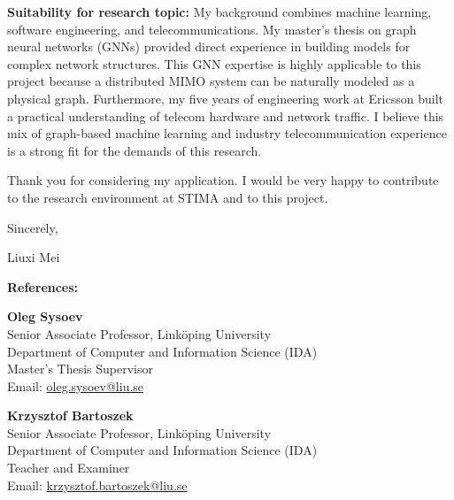 \documentclass[11pt,a4paper]{article}
\begin{document}
\textbf{Suitability for research topic:} My background combines machine learning, software engineering, and telecommunications. My master's thesis on graph neural networks (GNNs) provided direct experience in building models for complex network structures. This GNN expertise is highly applicable to this project because a distributed MIMO system can be naturally modeled as a physical graph. Furthermore, my five years of engineering work at Ericsson built a practical understanding of telecom hardware and network traffic. I believe this mix of graph-based machine learning and industry telecommunication experience is a strong fit for the demands of this research.

Thank you for considering my application. I would be very happy to contribute to the research environment at STIMA and to this project.

Sincerely,

Liuxi Mei

\vspace{0.5cm}
\noindent
\begin{minipage}{\textwidth}
\textbf{References:}

\vspace{0.3cm}
\begin{minipage}[t]{0.48\textwidth}
\textbf{Oleg Sysoev}\\
Senior Associate Professor, Linköping University\\
Department of Computer and Information Science (IDA)\\
Master's Thesis Supervisor\\
Email: \href{mailto:oleg.sysoev@liu.se}{oleg.sysoev@liu.se}
\end{minipage}%
\hfill
\begin{minipage}[t]{0.48\textwidth}
\textbf{Krzysztof Bartoszek}\\
Senior Associate Professor, Linköping University\\
Department of Computer and Information Science (IDA)\\
Teacher and Examiner\\
Email: \href{mailto:krzysztof.bartoszek@liu.se}{krzysztof.bartoszek@liu.se}
\end{minipage}
\end{minipage}
\end{document}
